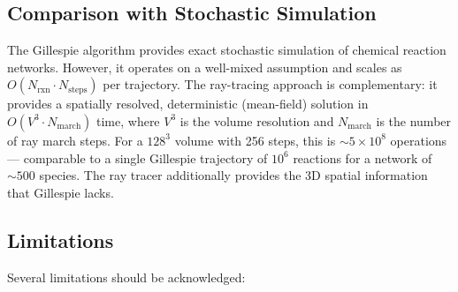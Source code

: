 \documentclass[11pt,twocolumn,a4paper]{article}
\begin{document}
\subsection{Comparison with Stochastic Simulation}

The Gillespie algorithm \citep{gillespie1977} provides exact
stochastic simulation of chemical reaction networks. However, it
operates on a well-mixed assumption and scales as $O(N_{\mathrm{rxn}}
\cdot N_{\mathrm{steps}})$ per trajectory. The ray-tracing approach
is complementary: it provides a spatially resolved, deterministic
(mean-field) solution in $O(V^3 \cdot N_{\mathrm{march}})$ time,
where $V^3$ is the volume resolution and $N_{\mathrm{march}}$ is the
number of ray march steps. For a $128^3$ volume with 256 steps, this
is $\sim\!5 \times 10^8$ operations --- comparable to a single
Gillespie trajectory of $10^6$ reactions for a network of $\sim\!500$
species. The ray tracer additionally provides the 3D spatial
information that Gillespie lacks.

\subsection{Limitations}

Several limitations should be acknowledged:
\end{document}
